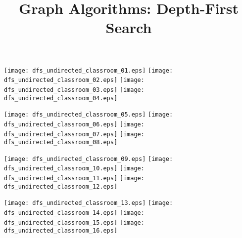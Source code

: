 \documentclass{article}
\title{Graph Algorithms: Depth-First Search}
\begin{document}
\maketitle
{}\vspace{1em}


\vspace{1em}


\texttt{[image: dfs\_undirected\_classroom\_01.eps]}
\vspace{1em}
\texttt{[image: dfs\_undirected\_classroom\_02.eps]}
\vspace{1em}
\texttt{[image: dfs\_undirected\_classroom\_03.eps]}
\vspace{1em}
\texttt{[image: dfs\_undirected\_classroom\_04.eps]}
\vspace{1em}


\texttt{[image: dfs\_undirected\_classroom\_05.eps]}
\vspace{1em}
\texttt{[image: dfs\_undirected\_classroom\_06.eps]}
\vspace{1em}
\texttt{[image: dfs\_undirected\_classroom\_07.eps]}
\vspace{1em}
\texttt{[image: dfs\_undirected\_classroom\_08.eps]}
\vspace{1em}


\texttt{[image: dfs\_undirected\_classroom\_09.eps]}
\vspace{1em}
\texttt{[image: dfs\_undirected\_classroom\_10.eps]}
\vspace{1em}
\texttt{[image: dfs\_undirected\_classroom\_11.eps]}
\vspace{1em}
\texttt{[image: dfs\_undirected\_classroom\_12.eps]}
\vspace{1em}


\texttt{[image: dfs\_undirected\_classroom\_13.eps]}
\vspace{1em}
\texttt{[image: dfs\_undirected\_classroom\_14.eps]}
\vspace{1em}
\texttt{[image: dfs\_undirected\_classroom\_15.eps]}
\vspace{1em}
\texttt{[image: dfs\_undirected\_classroom\_16.eps]}
\end{document}
